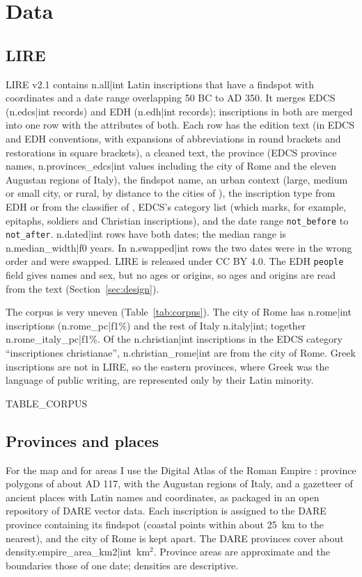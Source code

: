 \section{Data}\label{sec:data}
\subsection{LIRE}
LIRE v2.1 \citep{kase2023lire} contains {{n.all|int}} Latin inscriptions that have a findspot with coordinates and a date range overlapping 50 BC to AD 350. It merges EDCS ({{n.edcs|int}} records) and EDH ({{n.edh|int}} records); inscriptions in both are merged into one row with the attributes of both. Each row has the edition text (in EDCS and EDH conventions, with expansions of abbreviations in round brackets and restorations in square brackets), a cleaned text, the province (EDCS province names, {{n.provinces_edcs|int}} values including the city of Rome and the eleven Augustan regions of Italy), the findspot name, an urban context (large, medium or small city, or rural, by distance to the cities of \citet{hanson2016}), the inscription type from EDH or from the classifier of \citet{kase2021classifying}, EDCS's category list (which marks, for example, epitaphs, soldiers and Christian inscriptions), and the date range \texttt{not\_before} to \texttt{not\_after}. {{n.dated|int}} rows have both dates; the median range is {{n.median_width|f0}} years. In {{n.swapped|int}} rows the two dates were in the wrong order and were swapped. LIRE is released under CC BY 4.0. The EDH \texttt{people} field gives names and sex, but no ages or origins, so ages and origins are read from the text (Section~\ref{sec:design}).

The corpus is very uneven (Table~\ref{tab:corpus}). The city of Rome has {{n.rome|int}} inscriptions ({{n.rome_pc|f1}}\%) and the rest of Italy {{n.italy|int}}; together {{n.rome_italy_pc|f1}}\%. Of the {{n.christian|int}} inscriptions in the EDCS category ``inscriptiones christianae'', {{n.christian_rome|int}} are from the city of Rome. Greek inscriptions are not in LIRE, so the eastern provinces, where Greek was the language of public writing, are represented only by their Latin minority.

{{TABLE_CORPUS}}

\subsection{Provinces and places}
For the map and for areas I use the Digital Atlas of the Roman Empire \citep[DARE;][]{ahlfeldt2013}: province polygons of about AD 117, with the Augustan regions of Italy, and a gazetteer of ancient places with Latin names and coordinates, as packaged in an open repository of DARE vector data. Each inscription is assigned to the DARE province containing its findspot (coastal points within about 25~km to the nearest), and the city of Rome is kept apart. The DARE provinces cover about {{density.empire_area_km2|int}}~km$^2$. Province areas are approximate and the boundaries those of one date; densities are descriptive.

